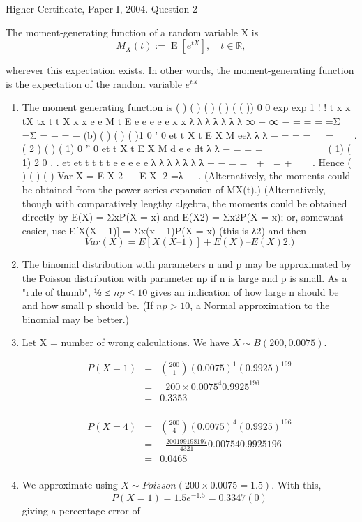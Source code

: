 \documentclass[a4paper,12pt]{article}
\begin{document}
Higher Certificate, Paper I, 2004. Question 2


The moment-generating function of a random variable X is 
\[{\displaystyle M_{X}(t):=\operatorname {E} \left[e^{tX}\right],\quad t\in \mathbb {R} ,} \]

wherever this expectation exists. In other words, the moment-generating function is the expectation of the random variable 
${\displaystyle e^{tX}} $
\begin{enumerate}
\item  The moment generating function is
( ) ( ) ( ) ( ) ( ( ))
0 0
exp exp 1
! !
t x x
tX tx t t
X
x x
e e M t E e e e e e
x x
λ
λ λ λ λ λ λ
∞ − ∞
−
= =
= =Σ =Σ = − = −
(b) ( ) ( ) ( )1
0
' 0
et t
X
t
E X M eeλ
λ λ −
=
= =   =  
.
( 2 ) ( ) ( 1)
0
'' 0
et t
X
t
E X M d e e
dt
λ λ −
=
= =         
( 1) ( 1) 2
0
. .
et et t t t
t
e e e e e λ λ λ λ λ λ λ − −
=
=  +  = +  
.
Hence ( ) ( ) ( ) Var X = E X 2 − E X 2 =λ   .
(Alternatively, the moments could be obtained from the power series
expansion of MX(t).)
(Alternatively, though with comparatively lengthy algebra, the
moments could be obtained directly by E(X) = ΣxP(X = x) and E(X2) =
Σx2P(X = x); or, somewhat easier, use E[X(X – 1)] = Σx(x – 1)P(X = x)
(this is λ2) and then 
\[Var(X) = E[X(X – 1)] + E(X) – {E(X)}2.)\]
\item  The binomial distribution with parameters n and p may be
approximated by the Poisson distribution with parameter np if n is
large and p is small. As a "rule of thumb", ½ ≤ $np \leq 10$ gives an
indication of how large n should be and how small p should be. (If
$np > 10$, a Normal approximation to the binomial may be better.)

\item  Let X = number of wrong calculations. We have $X \sim B(200, 0.0075)$.

\begin{eqnarray*}
P(X=1) &=& { 200 \choose 1}(0.0075)^1(0.9925)^{199} \\
&=&  200 \times  0.0075^4 0.9925^{196}\\
&=& 0.3353\\
\end{eqnarray*}

\begin{eqnarray*}
P(X=4) &=& { 200 \choose 4}(0.0075)^4(0.9925)^{196} \\
&=&  
\frac{200 199 198 197}{4 3 2 1} 0.00754 0.9925196\\
&=& 0.0468\\
\end{eqnarray*}
\item  We approximate using $X \sim Poisson(200 × 0.0075 = 1.5)$. With this,
\[P( X =1) =1.5e^{−1.5} = 0.3347(0)\]
giving a percentage error of 


\end{enumerate}
\end{document}
